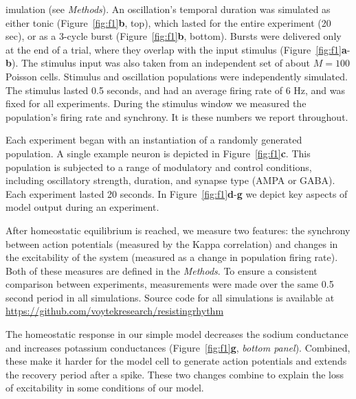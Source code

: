 \documentclass{article}
\begin{document}
imulation (see \textit{Methods}). An oscillation's temporal duration was simulated as either tonic (Figure~\ref{fig:f1}\textbf{b}, top), which lasted for the entire experiment (20 sec), or as a 3-cycle burst (Figure~\ref{fig:f1}\textbf{b}, bottom). Bursts were delivered only at the end of a trial, where they overlap with the input stimulus (Figure~\ref{fig:f1}\textbf{a}-\textbf{b}). The stimulus input was also taken from an independent set of about $M=100$ Poisson cells. Stimulus and oscillation populations were independently simulated. The stimulus lasted 0.5 seconds, and had an average firing rate of 6 Hz, and was fixed for all experiments. During the stimulus window we measured the population's firing rate and synchrony. It is these numbers we report throughout.

Each experiment began with an instantiation of a randomly generated population. A single example neuron is depicted in Figure~\ref{fig:f1}\textbf{c}. This population is subjected to a range of modulatory and control conditions, including oscillatory strength, duration, and synapse type (AMPA or GABA). Each experiment lasted 20 seconds. In Figure~\ref{fig:f1}\textbf{d}-\textbf{g} we depict key aspects of model output during an experiment. 

After homeostatic equilibrium is reached, we measure two features: the synchrony between action potentials (measured by the Kappa correlation) and changes in the excitability of the system (measured as a change in population firing rate). Both of these measures are defined in the \textit{Methods}. To ensure a consistent comparison between experiments, measurements were made over the same 0.5 second period in all simulations. Source code for all simulations is available at \url{https://github.com/voytekresearch/resistingrhythm}

The homeostatic response in our simple model decreases the sodium conductance and increases potassium conductances (Figure~\ref{fig:f1}\textbf{g}, \textit{bottom panel}). Combined, these make it harder for the model cell to generate action potentials and extends the recovery period after a spike. These two changes combine to explain the loss of excitability in some conditions of our model.
\end{document}
